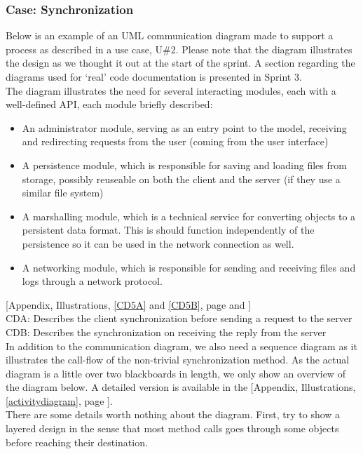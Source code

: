\subsubsection{Case: Synchronization}
Below is an example of an UML communication diagram made to support a process as described in a use case, U\#2. Please note that the diagram illustrates the design as we thought it out at the start of the sprint. A section regarding the diagrams used for ‘real’ code documentation is presented in Sprint 3. \\
The diagram illustrates the need for several interacting modules, each with a well-defined API, each module briefly described:\\
\begin{itemize}
\item An administrator module, serving as an entry point to the model, receiving and redirecting requests from the user (coming from the user interface)
\item A persistence module, which is responsible for saving and loading files from storage, possibly reuseable on both the client and the server (if they use a similar file system)
\item A marshalling module, which is a technical service for converting objects to a persistent data format. This is should function independently of the persistence so it can be used in the network connection as well.
\item A networking module, which is responsible for sending and receiving files and logs through a network protocol.
\end{itemize}
[Appendix, Illustrations, \ref{CD5A} and \ref{CD5B}, page \pageref{CD5A} and \pageref{CD5B}]\\
CDA: Describes the client synchronization before sending a request to the server\\
CDB: Describes the synchronization on receiving the reply from the server\\
\newline
In addition to the communication diagram, we also need a sequence diagram as it illustrates the call-flow of the non-trivial synchronization method. As the actual diagram is a little over two blackboards in length, we only show an overview of the diagram below. A detailed version is available in the [Appendix, Illustrations, \ref{activitydiagram}, page \pageref{activitydiagram}].\\
There are some details worth nothing about the diagram. First, try to show a layered design in the sense that most method calls goes through some objects before reaching their destination.\\
